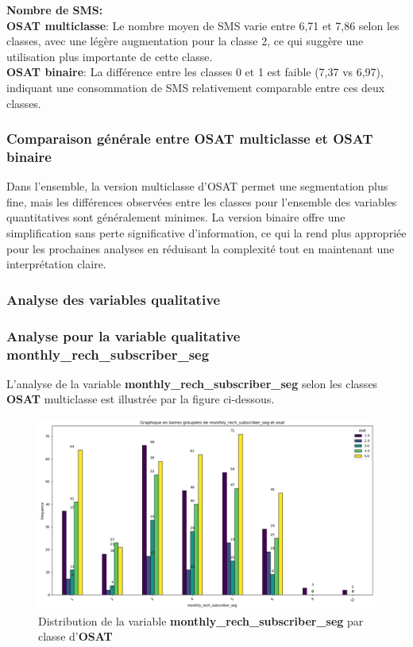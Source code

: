 \vspace{0.2cm}

\noindent \textbf{Nombre de SMS:} \\
\textbf{OSAT multiclasse}: Le nombre moyen de SMS varie entre 6,71 et 7,86 selon les classes, avec une légère augmentation pour la classe 2, ce qui suggère une utilisation plus importante de cette classe. \\
\textbf{OSAT binaire}: La différence entre les classes 0 et 1 est faible (7,37 vs 6,97), indiquant une consommation de SMS relativement comparable entre ces deux classes.

\vspace{0.2cm}

\subsubsection*{Comparaison générale entre OSAT multiclasse et OSAT binaire} 
Dans l'ensemble, la version multiclasse d'OSAT permet une segmentation plus fine, mais les différences observées entre les classes pour l'ensemble des variables quantitatives sont généralement minimes. La version binaire offre une simplification sans perte significative d'information, ce qui la rend plus appropriée pour les prochaines analyses en réduisant la complexité tout en maintenant une interprétation claire.

\subsubsection{Analyse des variables qualitative}
\subsubsection*{Analyse pour la variable qualitative \textbf{monthly\_rech\_subscriber\_seg}}

L'analyse de la variable \textbf{monthly\_rech\_subscriber\_seg} selon les classes \textbf{OSAT} multiclasse est illustrée par la figure ci-dessous.

\begin{figure}[H]
    \centering
    \includegraphics[width=1\linewidth]{barre_monthl_rech.png}
    \caption{Distribution de la variable \textbf{monthly\_rech\_subscriber\_seg} par classe d'\textbf{OSAT}}
    \label{fig:barre_monthl_rech}
\end{figure}

